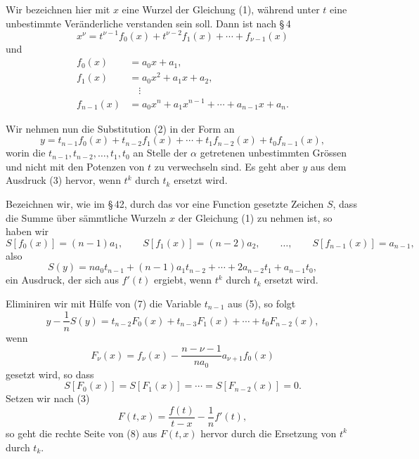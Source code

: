 \documentclass[11pt]{article}
\begin{document}
Wir bezeichnen hier mit $x$ eine Wurzel der Gleichung (1), während unter $t$ eine unbestimmte Veränderliche verstanden sein soll. Dann ist nach \S\,4
\begin{equation}
 x^\nu=t^{\nu-1}f_0(x)+t^{\nu-2}f_1(x)+\cdots+f_{\nu-1}(x)
\tag{3}
\end{equation}
und
\begin{equation}
\begin{aligned}
 f_0(x)&=a_0x+a_1,\\
 f_1(x)&=a_0x^2+a_1x+a_2,\\
 &\quad\vdots\\
 f_{n-1}(x)&=a_0x^n+a_1x^{n-1}+\cdots+a_{n-1}x+a_n.
\end{aligned}
\tag{4}
\end{equation}

Wir nehmen nun die Substitution (2) in der Form an
\begin{equation}
 y=t_{n-1}f_0(x)+t_{n-2}f_1(x)+\cdots+t_1f_{n-2}(x)+t_0f_{n-1}(x),
\tag{5}
\end{equation}
worin die $t_{n-1},t_{n-2},\ldots,t_1,t_0$ an Stelle der $\alpha$ getretenen unbestimmten Grössen und nicht mit den Potenzen von $t$ zu verwechseln sind. Es geht aber $y$ aus dem Ausdruck (3) hervor, wenn $t^k$ durch $t_k$ ersetzt wird.

Bezeichnen wir, wie im \S\,42, durch das vor eine Function gesetzte Zeichen $S$, dass die Summe über sämmtliche Wurzeln $x$ der Gleichung (1) zu nehmen ist, so haben wir
\begin{equation}
 S[f_0(x)]=(n-1)a_1,
 \qquad
 S[f_1(x)]=(n-2)a_2,
 \qquad\ldots,
 \qquad
 S[f_{n-1}(x)]=a_{n-1},
\tag{6}
\end{equation}
also
\begin{equation}
 S(y)=na_0t_{n-1}+(n-1)a_1t_{n-2}+\cdots+2a_{n-2}t_1+a_{n-1}t_0,
\tag{7}
\end{equation}
ein Ausdruck, der sich aus $f'(t)$ ergiebt, wenn $t^k$ durch $t_k$ ersetzt wird.

Eliminiren wir mit Hülfe von (7) die Variable $t_{n-1}$ aus (5), so folgt
\begin{equation}
 y-\frac1nS(y)=t_{n-2}F_0(x)+t_{n-3}F_1(x)+\cdots+t_0F_{n-2}(x),
\tag{8}
\end{equation}
wenn
\begin{equation}
 F_\nu(x)=f_\nu(x)-\frac{n-\nu-1}{n a_0}a_{\nu+1}f_0(x)
\tag{9}
\end{equation}
gesetzt wird, so dass
\begin{equation}
 S[F_0(x)]=S[F_1(x)]=\cdots=S[F_{n-2}(x)]=0.
\tag{10}
\end{equation}
Setzen wir nach (3)
\begin{equation}
 F(t,x)=\frac{f(t)}{t-x}-\frac1n f'(t),
\tag{11}
\end{equation}
so geht die rechte Seite von (8) aus $F(t,x)$ hervor durch die Ersetzung von $t^k$ durch $t_k$.
\end{document}
